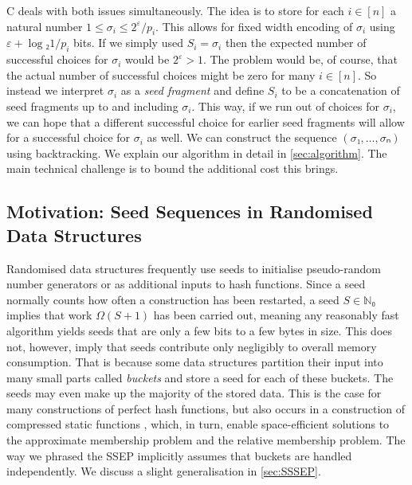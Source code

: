 \documentclass[cleveref,thm-restate]{lipics-v2021}
\def\consensus{\texorpdfstring{C\scalebox{0.8}{ONSENSUS}}{CONSENSUS}\xspace}
\begin{document}
\consensus deals with both issues simultaneously. The idea is to store for each $i ∈ [n]$ a natural number $1 ≤ σ_i ≤ 2^{ε}/p_i$. This allows for fixed width encoding of $σ_i$ using $ε + \log₂ 1/p_i$ bits. If we simply used $S_i = σ_i$ then the expected number of successful choices for $σ_i$ would be $2^ε > 1$. The problem would be, of course, that the actual number of successful choices might be zero for many $i ∈ [n]$. So instead we interpret $σ_i$ as a \emph{seed fragment} and define $S_i$ to be a concatenation of seed fragments up to and including $σ_i$. This way, if we run out of choices for $σ_i$, we can hope that a different successful choice for earlier seed fragments will allow for a successful choice for $σ_i$ as well. We can construct the sequence $(σ₁,…,σₙ)$ using backtracking.
We explain our algorithm in detail in \cref{sec:algorithm}.
The main technical challenge is to bound the additional cost this brings.

\subsection{Motivation: Seed Sequences in Randomised Data Structures}
\label{sec:motivation}



Randomised data structures frequently use seeds to initialise pseudo-random number generators or as additional inputs to hash functions.
Since a seed normally counts how often a construction has been restarted, a seed $S ∈ ℕ₀$ implies that work $Ω(S+1)$ has been carried out, meaning any reasonably fast algorithm yields seeds that are only a few bits to a few bytes in size. This does not, however, imply that seeds contribute only negligibly to overall memory consumption.
That is because some data structures partition their input into many small parts called \emph{buckets} and store a seed for each of these buckets. The seeds may even make up the majority of the stored data.
This is the case for many constructions of perfect hash functions, but also occurs in a construction of compressed static functions \cite{belazzougui2013compressed}, which, in turn, enable space-efficient solutions to the approximate membership problem and the relative membership problem.
The way we phrased the SSEP implicitly assumes that buckets are handled independently. We discuss a slight generalisation in \cref{sec:SSSEP}.
\end{document}
